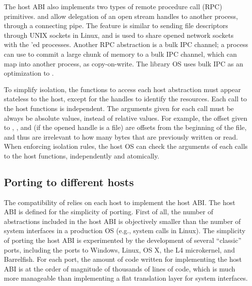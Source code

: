 The host ABI also implements two types of remote procedure call (RPC) primitives.
 and 
allow delegation of an open stream handles to another process, through a connecting pipe. The feature is similar to sending file descriptors through UNIX sockets in Linux, and is used to share opened network sockets with the 'ed processes.
Another RPC abstraction is a bulk IPC channel; a process can use  to commit a large chunk of memory to a bulk IPC channel, which  can map into another process, as copy-on-write. The library OS uses bulk IPC as an optimization to .


To simplify isolation, the functions to access each host abstraction must appear  stateless to the host, except for the handles to identify the resources. Each call to the host functions is independent. The arguments given for each call must be always be absolute values, instead of relative values.
For example, the offset given to , , and  (if the opened handle is a file) are offsets from the beginning of the file, and thus are irrelevant to how many bytes that are previously written or read.
When enforcing isolation rules, the host OS can check the arguments of each calls to the host functions, independently and atomically.

\subsection{Porting to different hosts}
\label{sec:overview:host:porting}


The compatibility of \graphene{} relies on each host to implement the host ABI.
The host ABI is defined for the simplicity of porting.
First of all, the number of abstractions included in the host ABI
is objectively smaller than the number of system interfaces in a production OS (e.g., system calls in Linux). 
The simplicity of porting the host ABI is experimented by the development of
several ``classic'' ports, including the ports to Windows, Linux, OS X,
the L4 microkernel, and Barrelfish.
For each port, the amount of code written for implementing the host ABI is at the order of magnitude of thousands of lines of code, which is much more manageable than implementing a flat translation layer for system interfaces.


